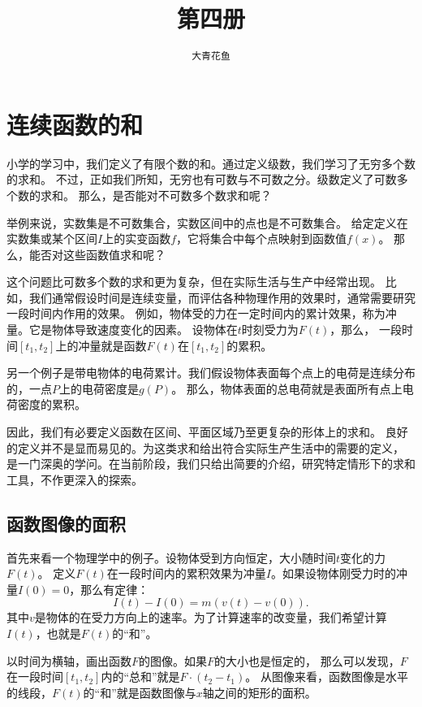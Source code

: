 \documentclass[12pt,UTF8]{ctexbook}
\title{\zihao{0} \bfseries 第四册}
\author{\zihao{2} \texttt{大青花鱼}}
\date{}
\begin{document}
\maketitle
\tableofcontents
\newpage

\chapter{连续函数的和}

小学的学习中，我们定义了有限个数的和。通过定义级数，我们学习了无穷多个数的求和。
不过，正如我们所知，无穷也有可数与不可数之分。级数定义了可数多个数的求和。
那么，是否能对不可数多个数求和呢？

举例来说，实数集是不可数集合，实数区间中的点也是不可数集合。
给定定义在实数集或某个区间$I$上的实变函数$f$，它将集合中每个点映射到函数值$f(x)$。
那么，能否对这些函数值求和呢？

这个问题比可数多个数的求和更为复杂，但在实际生活与生产中经常出现。
比如，我们通常假设时间是连续变量，而评估各种物理作用的效果时，通常需要研究一段时间内作用的效果。
例如，物体受的力在一定时间内的累计效果，称为冲量。它是物体导致速度变化的因素。
设物体在$t$时刻受力为$F(t)$，那么，
一段时间$[t_1, t_2]$上的冲量就是函数$F(t)$在$[t_1, t_2]$的累积。

另一个例子是带电物体的电荷累计。我们假设物体表面每个点上的电荷是连续分布的，一点$P$上的电荷密度是$g(P)$。
那么，物体表面的总电荷就是表面所有点上电荷密度的累积。

因此，我们有必要定义函数在区间、平面区域乃至更复杂的形体上的求和。
良好的定义并不是显而易见的。为这类求和给出符合实际生产生活中的需要的定义，
是一门深奥的学问。在当前阶段，我们只给出简要的介绍，研究特定情形下的求和工具，不作更深入的探索。

\section{函数图像的面积}

首先来看一个物理学中的例子。设物体受到方向恒定，大小随时间$t$变化的力$F(t)$。
定义$F(t)$在一段时间内的累积效果为冲量$I$。如果设物体刚受力时的冲量$I(0) = 0$，那么有定律：
$$ I(t) - I(0) = m(v(t) - v(0)).$$
其中$v$是物体的在受力方向上的速率。为了计算速率的改变量，我们希望计算$I(t)$，也就是$F(t)$的“和”。

以时间为横轴，画出函数$F$的图像。如果$F$的大小也是恒定的，
那么可以发现，$F$在一段时间$[t_1, t_2]$内的“总和”就是$F \cdot (t_2 - t_1)$。
从图像来看，函数图像是水平的线段，$F(t)$的“和”就是函数图像与$x$轴之间的矩形的面积。
\end{document}
